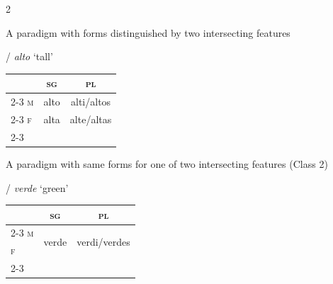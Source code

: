 \documentclass[output=paper,colorlinks,citecolor=brown]{langscibook}
\begin{document}
\hspace{-0.85cm} \begin{minipage}{\textwidth}
	\begin{multicols}{2}
		
		\begin{exe}
			\ex \label{04ex7}
			\begin{xlist}
				\ex \label{04ex7a} A paradigm with forms distinguished by two intersecting features
				
				\begin{center}
					/ \emph{alto} ‘tall’
					
				\begin{tabular}{lcc}
					& \textsc{sg} & \textsc{pl} \\
					\cline{2-3}
					\textsc{m} & \multicolumn{1}{|c}{alto} & \multicolumn{1}{|c|}{alti/altos} \\
					\cline{2-3}
					\textsc{f} & \multicolumn{1}{|c}{alta} & \multicolumn{1}{|c|}{alte/altas} \\
					\cline{2-3}
				\end{tabular}
				\end{center}
				
				\ex \label{04ex7b} A paradigm with same forms for one of two intersecting features (Class 2)
				
				\begin{center}
					/ \emph{verde} ‘green’
					
					\begin{tabular}{lcc}
						& \textsc{sg} & \textsc{pl} \\
						\cline{2-3}
						\textsc{m} & \multicolumn{1}{|c|}{\multirow{2}{*}{verde}} & \multicolumn{1}{c|}{\multirow{2}{*}{verdi/verdes}} \\
						\textsc{f} & \multicolumn{1}{|c|}{} & \multicolumn{1}{c|}{} \\
						\cline{2-3}
					\end{tabular}

				\end{center}
			\end{xlist}
		\end{exe}
		
	\end{multicols}
\end{minipage}
\end{document}
